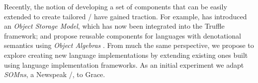Recently, the notion of developing a set of components that can be easily extended to create tailored \vms/ have gained traction. For example, \citet{WoB2014} has introduced an \emph{Object Storage Model}, which has now been integrated into the Truffle framework; and \citet{Inostroza2015} propose reusable components for languages with denotational semantics using \emph{Object Algebras} \cite{Oliveira2012}. From much the same perspective, we propose to explore creating new language implementations by extending existing ones built using language implementation frameworks. As an initial experiment we adapt \emph{SOMns}, a Newspeak \vm/, to Grace.


%




%






%
